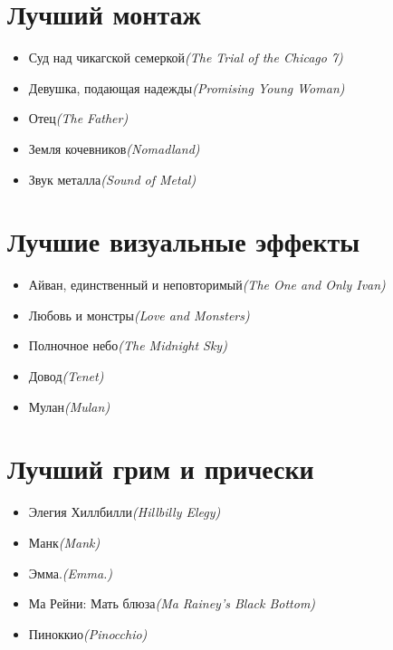 \documentclass[a4paper,10pt]{article}
\begin{document}
\begin{multicols}{2}
\section{Лучший монтаж}

\begin{itemize}
	\item Суд над чикагской семеркой\newline\textit{(The Trial of the Chicago 7)}
	\item Девушка, подающая надежды\newline\textit{(Promising Young Woman)}
	\item Отец\newline\textit{(The Father)}
	\item Земля кочевников\newline\textit{(Nomadland)}
	\item Звук металла\newline\textit{(Sound of Metal)}
\end{itemize}

\section{Лучшие визуальные эффекты}

\begin{itemize}
	\item Айван, единственный и неповторимый\newline\textit{(The One and Only Ivan)}
	\item Любовь и монстры\newline\textit{(Love and Monsters)}
	\item Полночное небо\newline\textit{(The Midnight Sky)}
	\item Довод\newline\textit{(Tenet)}
	\item Мулан\newline\textit{(Mulan)}
\end{itemize}

\section{Лучший грим и прически}

\begin{itemize}
	\item Элегия Хиллбилли\newline\textit{(Hillbilly Elegy)}
	\item Манк\newline\textit{(Mank)}
	\item Эмма.\newline\textit{(Emma.)}
	\item Ма Рейни: Мать блюза\newline\textit{(Ma Rainey's Black Bottom)}
	\item Пиноккио\newline\textit{(Pinocchio)}
\end{itemize}


\end{multicols}
\end{document}
